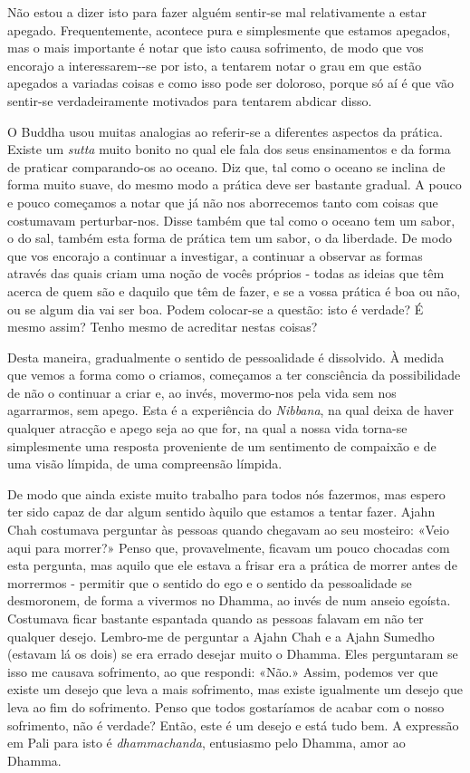 Não estou a dizer isto para fazer alguém sentir-se mal relativamente a
estar apegado. Frequentemente, acontece pura e simplesmente que estamos
apegados, mas o mais importante é notar que isto causa sofrimento, de
modo que vos encorajo a interessarem-\linebreak-se por isto, a tentarem notar o
grau em que estão apegados a variadas coisas e como isso pode ser
doloroso, porque só aí é que vão sentir-se verdadeiramente motivados
para tentarem abdicar disso.

O Buddha usou muitas analogias ao referir-se a diferentes aspectos da
prática. Existe um \emph{sutta} muito bonito no qual ele fala dos seus
ensinamentos e da forma de praticar comparando-os ao oceano. Diz que,
tal como o oceano se inclina de forma muito suave, do mesmo modo a
prática deve ser bastante gradual. A pouco e pouco começamos a notar que
já não nos aborrecemos tanto com coisas que costumavam perturbar-nos.
Disse também que tal como o oceano tem um sabor, o do sal, também esta
forma de prática tem um sabor, o da liberdade. De modo que vos encorajo
a continuar a investigar, a continuar a observar as formas através das
quais criam uma noção de vocês próprios - todas as ideias que têm acerca
de quem são e daquilo que têm de fazer, e se a vossa prática é boa ou
não, ou se algum dia vai ser boa. Podem colocar-se a questão: isto é
verdade? É mesmo assim? Tenho mesmo de acreditar nestas coisas?

Desta maneira, gradualmente o sentido de pessoalidade é dissolvido. À
medida que vemos a forma como o criamos, começamos a ter consciência da
possibilidade de não o continuar a criar e, ao invés, movermo-nos pela
vida sem nos agarrarmos, sem apego. Esta é a experiência do
\emph{Nibbana}, na qual deixa de haver qualquer atracção e apego seja ao
que for, na qual a nossa vida torna-se simplesmente uma resposta
proveniente de um sentimento de compaixão e de uma visão límpida, de uma
compreensão límpida.

De modo que ainda existe muito trabalho para todos nós fazermos, mas
espero ter sido capaz de dar algum sentido àquilo que estamos a tentar
fazer. Ajahn Chah costumava perguntar às pessoas quando chegavam ao seu
mosteiro: «Veio aqui para morrer?» Penso que, provavelmente, ficavam um
pouco chocadas com esta pergunta, mas aquilo que ele estava a frisar era
a prática de morrer antes de morrermos - permitir que o sentido do ego e
o sentido da pessoalidade se desmoronem, de forma a vivermos no Dhamma,
ao invés de num anseio egoísta. Costumava ficar bastante espantada
quando as pessoas falavam em não ter qualquer desejo. Lembro-me de
perguntar a Ajahn Chah e a Ajahn Sumedho (estavam lá os dois) se era
errado desejar muito o Dhamma. Eles perguntaram se isso me causava
sofrimento, ao que respondi: «Não.» Assim, podemos ver que existe um
desejo que leva a mais sofrimento, mas existe igualmente um desejo que
leva ao fim do sofrimento. Penso que todos gostaríamos de acabar com o
nosso sofrimento, não é verdade? Então, este é um desejo e está tudo
bem. A expressão em Pali para isto é \emph{dhammachanda}, entusiasmo
pelo Dhamma, amor ao Dhamma.

